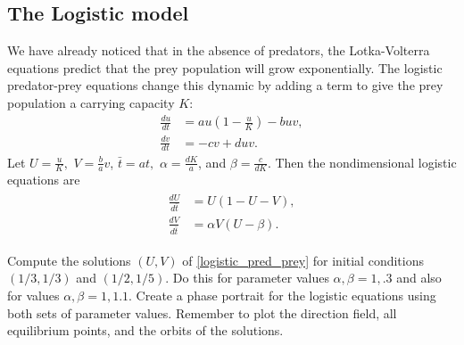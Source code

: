 \subsection*{The Logistic model}
We have already noticed that in the absence of predators, the Lotka-Volterra equations predict that the prey population will grow exponentially.
The logistic predator-prey equations change this dynamic by adding a term to give the prey population a carrying capacity $K$:
\begin{align*}
	\frac{du}{dt} &= au\left(1 -\frac{u}{K}\right) - buv,\\
	\frac{dv}{dt} &= -cv + duv.
\end{align*}
Let $U = \frac{u}{K},$ $V = \frac{b}{a}v$, $\bar{t} = at,$  $\alpha = \frac{dK}{a}$, and $\beta = \frac{c}{dK}$.
Then the nondimensional logistic equations are
\begin{align}
	\begin{split}
	\frac{dU}{d\bar{t}} &= U(1-U-V),\\
	\frac{dV}{d\bar{t}} &= \alpha V (U-\beta).
	\end{split} \label{logistic_pred_prey}
\end{align}

\begin{problem}
Compute the solutions $(U,V)$ of \eqref{logistic_pred_prey}
for initial conditions $(1/3, 1/3)$ and $(1/2, 1/5)$.
Do this for parameter values $\alpha, \beta = 1, .3$ and also for values $\alpha, \beta = 1, 1.1$.
Create a phase portrait for the logistic equations using both sets of parameter values.
Remember to plot the direction field, all equilibrium points, and the orbits of the solutions.
\end{problem} 